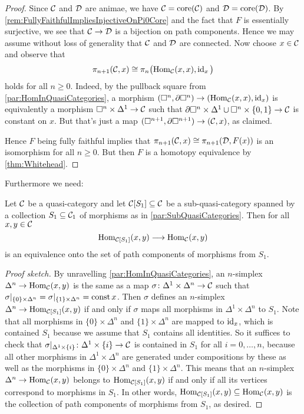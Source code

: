 \begin{proof}
	Since $\mathcal{C}$ and $\mathcal{D}$ are animae, we have $\mathcal{C}=\operatorname{core}(\mathcal{C})$ and $\mathcal{D}=\operatorname{core}(\mathcal{D})$. By \cref{rem:FullyFaithfulImpliesInjectiveOnPi0Core} and the fact that $F$ is essentially surjective, we see that $\mathcal{C}\rightarrow\mathcal{D}$ is a bijection on path components. Hence we may assume without loss of generality that $\mathcal{C}$ and $\mathcal{D}$ are connected. Now choose $x\in\mathcal{C}$ and observe that
	\begin{equation*}
		\pi_{n+1}(\Cc,x)\cong \pi_n\lef(\Hom_\Cc(x,x),\id_x\righ)
	\end{equation*}
	holds for all $n\geqslant 0$. Indeed, by the pullback square from \cref{par:HomInQuasiCategories}, a morphism $(\square^n,\partial\square^n)\rightarrow (\operatorname{Hom}_{\mathcal{C}}(x,x),\operatorname{id}_x)$ is equivalently a morphism $\square^n\times\Delta^1\rightarrow \mathcal{C}$ such that $\partial \square^n\times\Delta^1\cup\square^n\times\{0,1\}\rightarrow \mathcal{C}$ is constant on $x$. But that's just a map $(\square^{n+1},\partial\square^{n+1})\rightarrow(\mathcal{C},x)$, as claimed.
	
	Hence $F$ being fully faithful implies that $\pi_{n+1}(\mathcal{C},x)\cong\pi_{n+1}(\mathcal{D},F(x))$ is an isomorphism for all $n\geqslant 0$. But then $F$ is a homotopy equivalence by \cref{thm:Whitehead}.
\end{proof}
Furthermore we need:
\begin{lem}\label{lem:NonFullSubcategory}
	Let $\mathcal{C}$ be a quasi-category and let $\mathcal{C}[S_1]\subseteq \mathcal{C}$ be a  sub-quasi-category spanned by a collection $S_1\subseteq \mathcal{C}_1$ of morphisms as in \cref{par:SubQuasiCategories}. Then for all $x,y\in\mathcal{C}$
	\begin{equation*}
		\operatorname{Hom}_{\mathcal{C}[S_1]}(x,y)\longrightarrow \operatorname{Hom}_{\mathcal{C}}(x,y)
	\end{equation*}
	is an equivalence onto the set of path components of morphisms from $S_1$.
\end{lem}
\begin{proof}[Proof sketch]
	By unravelling \cref{par:HomInQuasiCategories}, an $n$-simplex $\Delta^n\rightarrow \operatorname{Hom}_{\mathcal{C}}(x,y)$ is the same as a map $\sigma\colon \Delta^1\times\Delta^n\rightarrow \mathcal{C}$ such that $\sigma|_{\{0\}\times \Delta^n}=\sigma|_{\{1\}\times\Delta^n}=\operatorname{const} x$. Then $\sigma$ defines an $n$-simplex $\Delta^n\rightarrow \operatorname{Hom}_{\mathcal{C}[S_1]}(x,y)$ if and only if $\sigma$ maps all morphisms in $\Delta^1\times\Delta^n$ to $S_1$. Note that all morphisms in $\{0\}\times\Delta^n$ and $\{1\}\times\Delta^n$ are mapped to $\operatorname{id}_x$, which is contained $S_1$ because we assume that $S_1$ contains all identities. So it suffices to check that $\sigma|_{\Delta^1\times\{i\}}\colon \Delta^1\times\{i\}\rightarrow \mathcal{C}$ is contained in $S_1$ for all $i=0,\dotsc,n$, because all other morphisms in $\Delta^1\times\Delta^n$ are generated under compositions by these as well as the morphisms in $\{0\}\times \Delta^n$ and $\{1\}\times\Delta^n$. This means that an $n$-simplex $\Delta^n\rightarrow \operatorname{Hom}_{\mathcal{C}}(x,y)$ belongs to $\operatorname{Hom}_{\mathcal{C}[S_1]}(x,y)$ if and only if all its vertices correspond to morphisms in $S_1$. In other words, $\operatorname{Hom}_{\mathcal{C}[S_1]}(x,y)\subseteq\operatorname{Hom}_{\mathcal{C}}(x,y)$ is the collection of path components of morphisms from $S_1$, as desired.
\end{proof}
